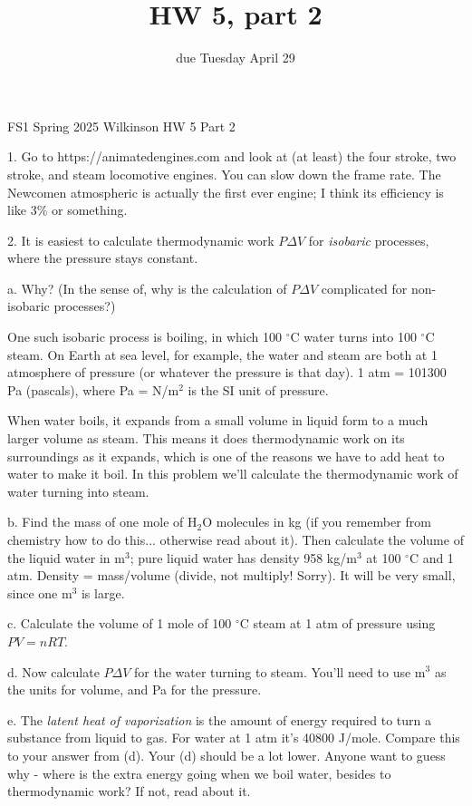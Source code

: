 \documentclass[12pt]{article}
\title{HW 5, part 2}
\date{due Tuesday April 29}
\begin{document}
\setlength{\parindent}{0pt}
\setlength{\parskip}{3mm}

FS1 Spring 2025 Wilkinson
HW 5 Part 2

1. Go to https://animatedengines.com and look at (at least) the four stroke, two stroke, and steam locomotive engines. You can slow down the frame rate. The Newcomen atmospheric is actually the first ever engine; I think its efficiency is like 3\% or something.

2. It is easiest to calculate thermodynamic work $P\Delta V$ for \textit{isobaric} processes, where the pressure stays constant.

a. Why? (In the sense of, why is the calculation of $P\Delta V$ complicated for non-isobaric processes?)

One such isobaric process is boiling, in which 100 $^{\circ}$C water turns into 100 $^{\circ}$C steam. On Earth at sea level, for example, the water and steam are both at 1 atmosphere of pressure (or whatever the pressure is that day). 1 atm = 101300 Pa (pascals), where Pa = N/m$^2$ is the SI unit of pressure.

When water boils, it expands from a small volume in liquid form to a much larger volume as steam. This means it does thermodynamic work on its surroundings as it expands, which is one of the reasons we have to add heat to water to make it boil. In this problem we'll calculate the thermodynamic work of water turning into steam.

b. Find the mass of one mole of H$_2$O molecules in kg (if you remember from chemistry how to do this... otherwise read about it). Then calculate the volume of the liquid water in m$^3$; pure liquid water has density 958 kg/m$^3$ at 100 $^{\circ}$C and 1 atm. Density = mass/volume (divide, not multiply! Sorry). It will be very small, since one m$^3$ is large. 

c. Calculate the volume of 1 mole of 100 $^{\circ}$C steam at 1 atm of pressure using $PV=nRT$. 

d. Now calculate $P\Delta V$ for the water turning to steam. You'll need to use m$^3$ as the units for volume, and Pa for the pressure.

e. The \textit{latent heat of vaporization} is the amount of energy required to turn a substance from liquid to gas. For water at 1 atm it's 40800 J/mole. Compare this to your answer from (d). Your (d) should be a lot lower. Anyone want to guess why - where is the extra energy going when we boil water, besides to thermodynamic work? If not, read about it.
\end{document}
